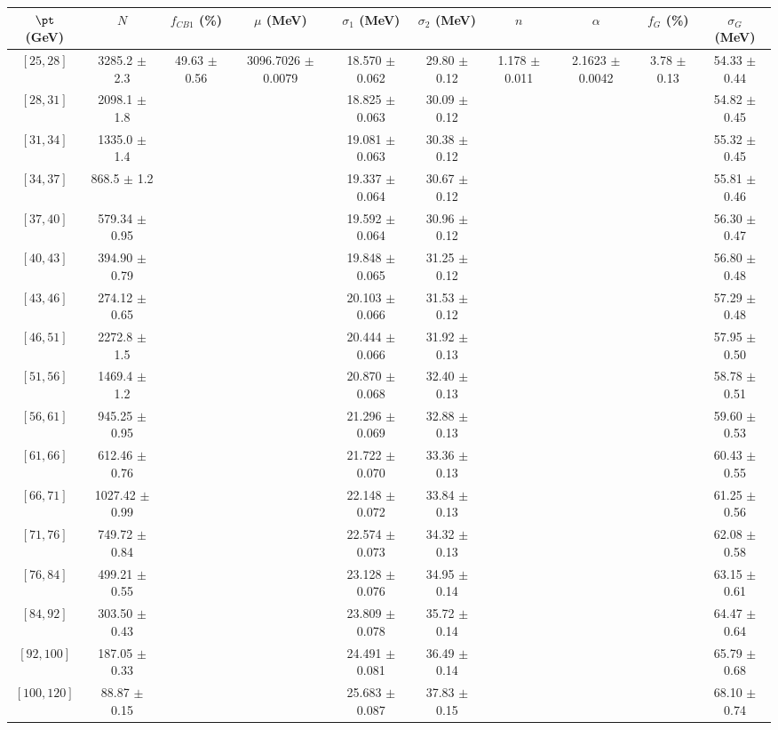\begin{tabular}{c||c|c|c|c|c|c|c|c|c}
$\pt$ (GeV) & $N$ & $f_{CB1}$ (\%)  & $\mu$ (MeV) & $\sigma_1$ (MeV) & $\sigma_2$ (MeV) & $n$ & $\alpha$ & $f_G$ (\%) & $\sigma_G$ (MeV) \\
\hline
$[25, 28]$ & 3285.2 $\pm$ 2.3 & \multirow{17}{*}{49.63 $\pm$ 0.56} & \multirow{17}{*}{3096.7026 $\pm$ 0.0079} & 18.570 $\pm$ 0.062 & 29.80 $\pm$ 0.12 & \multirow{17}{*}{1.178 $\pm$ 0.011} & \multirow{17}{*}{2.1623 $\pm$ 0.0042} & \multirow{17}{*}{3.78 $\pm$ 0.13} & 54.33 $\pm$ 0.44\\
$[28, 31]$ & 2098.1 $\pm$ 1.8 &  &  & 18.825 $\pm$ 0.063 & 30.09 $\pm$ 0.12 &  &  &  & 54.82 $\pm$ 0.45\\
$[31, 34]$ & 1335.0 $\pm$ 1.4 &  &  & 19.081 $\pm$ 0.063 & 30.38 $\pm$ 0.12 &  &  &  & 55.32 $\pm$ 0.45\\
$[34, 37]$ & 868.5 $\pm$ 1.2 &  &  & 19.337 $\pm$ 0.064 & 30.67 $\pm$ 0.12 &  &  &  & 55.81 $\pm$ 0.46\\
$[37, 40]$ & 579.34 $\pm$ 0.95 &  &  & 19.592 $\pm$ 0.064 & 30.96 $\pm$ 0.12 &  &  &  & 56.30 $\pm$ 0.47\\
$[40, 43]$ & 394.90 $\pm$ 0.79 &  &  & 19.848 $\pm$ 0.065 & 31.25 $\pm$ 0.12 &  &  &  & 56.80 $\pm$ 0.48\\
$[43, 46]$ & 274.12 $\pm$ 0.65 &  &  & 20.103 $\pm$ 0.066 & 31.53 $\pm$ 0.12 &  &  &  & 57.29 $\pm$ 0.48\\
$[46, 51]$ & 2272.8 $\pm$ 1.5 &  &  & 20.444 $\pm$ 0.066 & 31.92 $\pm$ 0.13 &  &  &  & 57.95 $\pm$ 0.50\\
$[51, 56]$ & 1469.4 $\pm$ 1.2 &  &  & 20.870 $\pm$ 0.068 & 32.40 $\pm$ 0.13 &  &  &  & 58.78 $\pm$ 0.51\\
$[56, 61]$ & 945.25 $\pm$ 0.95 &  &  & 21.296 $\pm$ 0.069 & 32.88 $\pm$ 0.13 &  &  &  & 59.60 $\pm$ 0.53\\
$[61, 66]$ & 612.46 $\pm$ 0.76 &  &  & 21.722 $\pm$ 0.070 & 33.36 $\pm$ 0.13 &  &  &  & 60.43 $\pm$ 0.55\\
$[66, 71]$ & 1027.42 $\pm$ 0.99 &  &  & 22.148 $\pm$ 0.072 & 33.84 $\pm$ 0.13 &  &  &  & 61.25 $\pm$ 0.56\\
$[71, 76]$ & 749.72 $\pm$ 0.84 &  &  & 22.574 $\pm$ 0.073 & 34.32 $\pm$ 0.13 &  &  &  & 62.08 $\pm$ 0.58\\
$[76, 84]$ & 499.21 $\pm$ 0.55 &  &  & 23.128 $\pm$ 0.076 & 34.95 $\pm$ 0.14 &  &  &  & 63.15 $\pm$ 0.61\\
$[84, 92]$ & 303.50 $\pm$ 0.43 &  &  & 23.809 $\pm$ 0.078 & 35.72 $\pm$ 0.14 &  &  &  & 64.47 $\pm$ 0.64\\
$[92, 100]$ & 187.05 $\pm$ 0.33 &  &  & 24.491 $\pm$ 0.081 & 36.49 $\pm$ 0.14 &  &  &  & 65.79 $\pm$ 0.68\\
$[100, 120]$ & 88.87 $\pm$ 0.15 &  &  & 25.683 $\pm$ 0.087 & 37.83 $\pm$ 0.15 &  &  &  & 68.10 $\pm$ 0.74\\
\end{tabular}
